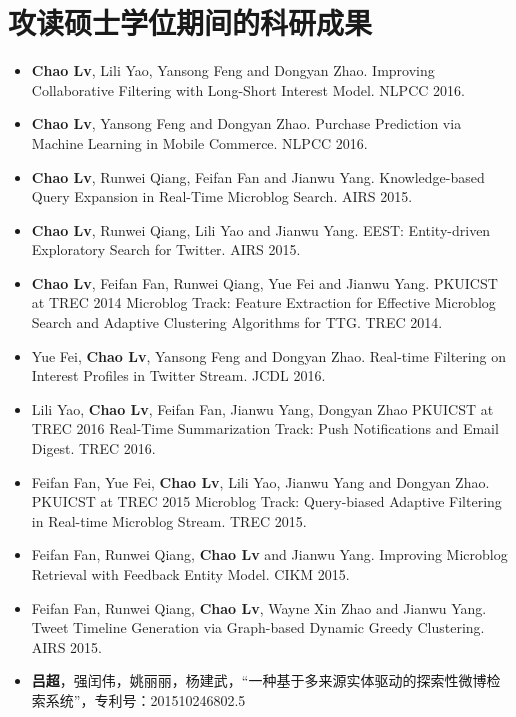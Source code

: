 
\chapter{攻读硕士学位期间的科研成果}
\begin{itemize}
\item \textbf{Chao Lv}, Lili Yao, Yansong Feng and Dongyan Zhao. Improving Collaborative Filtering with Long-Short Interest Model. NLPCC 2016.
\item \textbf{Chao Lv}, Yansong Feng and Dongyan Zhao. Purchase Prediction via Machine Learning in Mobile Commerce. NLPCC 2016.
\item \textbf{Chao Lv}, Runwei Qiang, Feifan Fan and Jianwu Yang. Knowledge-based Query Expansion in Real-Time Microblog Search. AIRS 2015.
\item \textbf{Chao Lv}, Runwei Qiang, Lili Yao and Jianwu Yang. EEST: Entity-driven Exploratory Search for Twitter. AIRS 2015.
\item \textbf{Chao Lv}, Feifan Fan, Runwei Qiang, Yue Fei and Jianwu Yang. PKUICST at TREC 2014 Microblog Track: Feature Extraction for Effective Microblog Search and Adaptive Clustering Algorithms for TTG. TREC 2014.
\item Yue Fei, \textbf{Chao Lv}, Yansong Feng and Dongyan Zhao. Real-time Filtering on Interest Profiles in Twitter Stream. JCDL 2016.
\item Lili Yao, \textbf{Chao Lv}, Feifan Fan, Jianwu Yang, Dongyan Zhao PKUICST at TREC 2016 Real-Time Summarization Track: Push Notifications and Email Digest. TREC 2016.
\item Feifan Fan, Yue Fei, \textbf{Chao Lv}, Lili Yao, Jianwu Yang and Dongyan Zhao. PKUICST at TREC 2015 Microblog Track: Query-biased Adaptive Filtering in Real-time Microblog Stream. TREC 2015.
\item Feifan Fan, Runwei Qiang, \textbf{Chao Lv} and Jianwu Yang. Improving Microblog Retrieval with Feedback Entity Model. CIKM 2015.
\item Feifan Fan, Runwei Qiang, \textbf{Chao Lv}, Wayne Xin Zhao and Jianwu Yang. Tweet Timeline Generation via Graph-based Dynamic Greedy Clustering. AIRS 2015.
\item \textbf{吕超}，强闰伟，姚丽丽，杨建武，``一种基于多来源实体驱动的探索性微博检索系统''，专利号：201510246802.5
\end{itemize}
